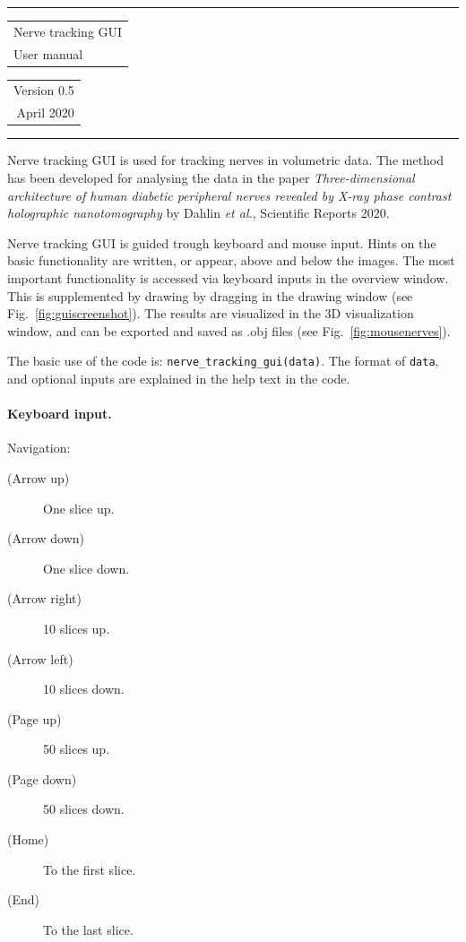 \documentclass[paper=a4, fontsize=8pt]{article}
\begin{document}
	\begin{large}\hrule height 1pt
		\begin{tabular}{@{}l@{}} Nerve tracking GUI \\ User manual\end{tabular}
		\begin{tabular}{@{}r@{}} Version 0.5 \\ April 2020\end{tabular}\hrule	
	\end{large}\par\vspace{\baselineskip}
	
Nerve tracking GUI is used for tracking nerves in volumetric data. The method has been developed for analysing the data in the paper \emph{Three-dimensional architecture of human diabetic peripheral nerves revealed by X-ray phase contrast holographic nanotomography} by Dahlin \emph{et al.}, Scientific Reports 2020.

Nerve tracking GUI is guided trough keyboard and mouse input. Hints on the basic functionality are written, or appear, above and below the images. The most important functionality is accessed via keyboard inputs in the overview window. This is supplemented by drawing by dragging in the drawing window (see Fig.~\ref{fig:guiscreenshot}). The results are visualized in the 3D visualization window, and can be exported and saved as .obj files (see Fig.~\ref{fig:mousenerves}).

The basic use of the code is: \texttt{nerve\_tracking\_gui(data)}. The format of \texttt{data}, and  optional inputs are explained in the help text in the code.

\paragraph{Keyboard input.} Navigation:
\begin{description}
		\item[(Arrow up)] One slice up.
		\item[(Arrow down)] One slice down.
		\item[(Arrow right)] 10 slices up.
		\item[(Arrow left)] 10 slices down.
		\item[(Page up)] 50 slices up.
		\item[(Page down)] 50 slices down.
		\item[(Home)] To the first slice.
		\item[(End)] To the last slice.
\end{description}
\end{document}

